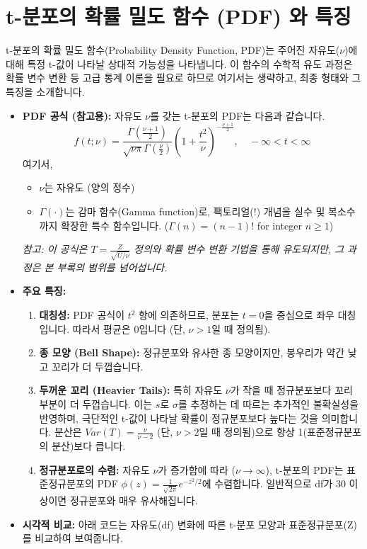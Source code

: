 \documentclass[
  letterpaper,
]{book}
\providecommand{\tightlist}{%
  \setlength{\itemsep}{0pt}\setlength{\parskip}{0pt}}
\begin{document}
\chapter{t-분포의 확률 밀도 함수 (PDF) 와
특징}\label{t-uxbd84uxd3ecuxc758-uxd655uxb960-uxbc00uxb3c4-uxd568uxc218-pdf-uxc640-uxd2b9uxc9d5}

t-분포의 확률 밀도 함수(Probability Density Function, PDF)는 주어진
자유도(\(\nu\))에 대해 특정 t-값이 나타날 상대적 가능성을 나타냅니다. 이
함수의 수학적 유도 과정은 확률 변수 변환 등 고급 통계 이론을 필요로
하므로 여기서는 생략하고, 최종 형태와 그 특징을 소개합니다.

\begin{itemize}
\item
  \textbf{PDF 공식 (참고용):} 자유도 \(\nu\)를 갖는 t-분포의 PDF는
  다음과 같습니다.
  \[f(t; \nu) = \frac{\Gamma\left(\frac{\nu+1}{2}\right)}{\sqrt{\nu\pi}\Gamma\left(\frac{\nu}{2}\right)} \left(1 + \frac{t^2}{\nu}\right)^{-\frac{\nu+1}{2}}, \quad -\infty < t < \infty\]
  여기서,

  \begin{itemize}
  \tightlist
  \item
    \(\nu\)는 자유도 (양의 정수)
  \item
    \(\Gamma(\cdot)\)는 감마 함수(Gamma function)로, 팩토리얼(!) 개념을
    실수 및 복소수까지 확장한 특수 함수입니다. (\(\Gamma(n) = (n-1)!\)
    for integer \(n \ge 1\))
  \end{itemize}

  \emph{참고: 이 공식은 \(T = \frac{Z}{\sqrt{U/\nu}}\) 정의와 확률 변수
  변환 기법을 통해 유도되지만, 그 과정은 본 부록의 범위를 넘어섭니다.}
\item
  \textbf{주요 특징:}

  \begin{enumerate}
  \def\labelenumi{\arabic{enumi}.}
  \tightlist
  \item
    \textbf{대칭성:} PDF 공식이 \(t^2\) 항에 의존하므로, 분포는
    \(t=0\)을 중심으로 좌우 대칭입니다. 따라서 평균은 0입니다 (단,
    \(\nu > 1\)일 때 정의됨).
  \item
    \textbf{종 모양 (Bell Shape):} 정규분포와 유사한 종 모양이지만,
    봉우리가 약간 낮고 꼬리가 더 두껍습니다.
  \item
    \textbf{두꺼운 꼬리 (Heavier Tails):} 특히 자유도 \(\nu\)가 작을 때
    정규분포보다 꼬리 부분이 더 두껍습니다. 이는 \(s\)로 \(\sigma\)를
    추정하는 데 따르는 추가적인 불확실성을 반영하며, 극단적인 t-값이
    나타날 확률이 정규분포보다 높다는 것을 의미합니다. 분산은
    \(Var(T) = \frac{\nu}{\nu-2}\) (단, \(\nu > 2\)일 때 정의됨)으로
    항상 1(표준정규분포의 분산)보다 큽니다.
  \item
    \textbf{정규분포로의 수렴:} 자유도 \(\nu\)가 증가함에 따라
    (\(\nu \to \infty\)), t-분포의 PDF는 표준정규분포의 PDF
    \(\phi(z) = \frac{1}{\sqrt{2\pi}} e^{-z^2/2}\)에 수렴합니다.
    일반적으로 df가 30 이상이면 정규분포와 매우 유사해집니다.
  \end{enumerate}
\item
  \textbf{시각적 비교:} 아래 코드는 자유도(df) 변화에 따른 t-분포 모양과
  표준정규분포(Z)를 비교하여 보여줍니다.
\end{itemize}
\end{document}
